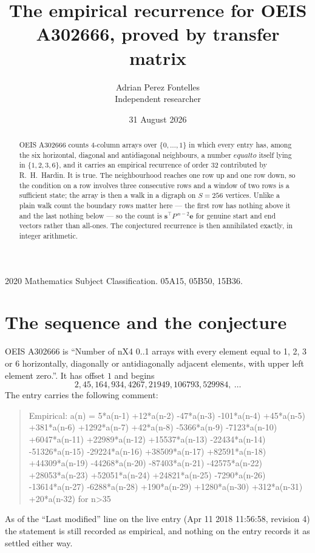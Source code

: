 \documentclass[11pt,a4paper]{article}
\title{The empirical recurrence for OEIS A302666, proved by transfer matrix}
\author{Adrian Perez Fontelles\\ \small Independent researcher}
\date{31 August 2026}
\theoremstyle{plain}
\theoremstyle{definition}
\begin{document}
\maketitle

\begin{abstract}
OEIS A302666 counts $4$-column arrays over $\{0,\dots,1\}$ in which every entry has,
among the six horizontal, diagonal and antidiagonal neighbours, a number $equal to$ itself lying in $\{1,2,3,6\}$, and it carries an empirical
recurrence of order $32$ contributed by R.~H.~Hardin. It is true. The neighbourhood
reaches one row up and one row down, so the condition on a row involves three consecutive
rows and a window of two rows is a sufficient state; the array is then a walk in a digraph
on $S=256$ vertices. Unlike a plain walk count the boundary rows matter here --- the first
row has nothing above it and the last nothing below --- so the count is
$\mathbf{s}^{\!\top}P^{\,n-2}\mathbf{e}$ for genuine start and end vectors rather than
all-ones. The conjectured recurrence is then annihilated exactly, in integer arithmetic.
\end{abstract}

\noindent\small 2020 Mathematics Subject Classification. 05A15, 05B50, 15B36.\normalsize

\section{The sequence and the conjecture}

OEIS A302666 is ``Number of nX4 0..1 arrays with every element equal to 1, 2, 3 or 6 horizontally, diagonally or antidiagonally adjacent elements, with upper left element zero.''. It has offset
$1$ and begins
\[
2, 45, 164, 934, 4267, 21949, 106793, 529984,\ \dots
\]
The entry carries the following comment:
\begin{quote}\small
Empirical: a(n) = 5*a(n-1) +12*a(n-2) -47*a(n-3) -101*a(n-4) +45*a(n-5) +381*a(n-6) +1292*a(n-7) +42*a(n-8) -5366*a(n-9) -7123*a(n-10) +6047*a(n-11) +22989*a(n-12) +15537*a(n-13) -22434*a(n-14) -51326*a(n-15) -29224*a(n-16) +38509*a(n-17) +82591*a(n-18) +44309*a(n-19) -44268*a(n-20) -87403*a(n-21) -42575*a(n-22) +28053*a(n-23) +52051*a(n-24) +24821*a(n-25) -7290*a(n-26) -13614*a(n-27) -6288*a(n-28) +190*a(n-29) +1280*a(n-30) +312*a(n-31) +20*a(n-32) for n>35
\end{quote}
As of the ``Last modified'' line on the live entry (Apr 11 2018 11:56:58, revision
4) the statement is still recorded as empirical, and nothing on the entry
records it as settled either way.
\end{document}
